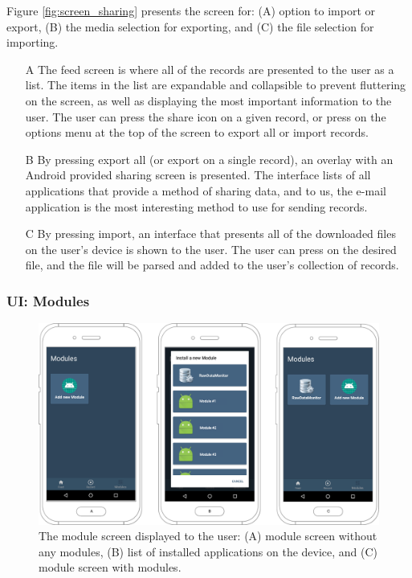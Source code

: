 Figure \ref{fig:screen_sharing} presents the screen for: (A) option to import or export, (B) the media selection for exporting, and (C) the file selection for importing.

\begin{itemize}
    \item[A] The feed screen is where all of the records are presented to the user as a list. The items in the list are expandable and collapsible to prevent fluttering on the screen, as well as displaying the most important information to the user. The user can press the share icon on a given record, or press on the options menu at the top of the screen to export all or import records.
    \item[B] By pressing export all (or export on a single record), an overlay with an Android provided sharing screen is presented. The interface lists of all applications that provide a method of sharing data, and to us, the e-mail application is the most interesting method to use for sending records. 
    \item[C] By pressing import, an interface that presents all of the downloaded files on the user's device is shown to the user. The user can press on the desired file, and the file will be parsed and added to the user's collection of records.  
\end{itemize}

\subsubsection{UI: Modules}
\begin{figure}[!h]
    \centering
    \includegraphics[scale=0.26]{images/Modules_img.pdf}
    \caption{The module screen displayed to the user: (A) module screen without any modules, (B) list of installed applications on the device, and (C) module screen with modules.}
    \label{fig:screen_modules}
\end{figure}

